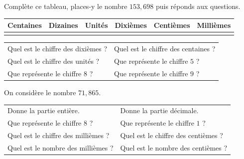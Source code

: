 \documentclass[a4paper,10pt]{report}
\begin{document}
\begin{ex}
Complète ce tableau, places-y le nombre $153,698$ puis réponds aux questions.
\begin{center}
\renewcommand{\arraystretch}{1.8}
\begin{tabularx}{\linewidth}{|*{6}{>{\centering \arraybackslash}X|}}
\rowcolor{exer1!20}Centaines & Dizaines & Unités & Dixièmes & Centièmes & Millièmes \\\hline
& & & & & \\\hline
\end{tabularx}
\end{center}

\begin{enumerate}
\begin{tabular}{m{7cm}m{7cm}}	
\item Quel est le chiffre des dixièmes ?&
\item Quel est le chiffre des centaines ?\\
\item Quel est le chiffre des unités ?&
\item Que représente le chiffre $5$ ?\\
\item Que représente le chiffre $8$ ?&
\item Que représente le chiffre $9$ ?\\
\end{tabular}
\end{enumerate}
\end{ex}

\begin{ex}
On considère le nombre $71,865$.
\begin{enumerate}
\begin{tabular}{m{7cm}m{7cm}}	
\item Donne la partie entière.&
\item Donne la partie décimale.\\
\item Que représente le chiffre $8$ ?&
\item Que représente le chiffre $1$ ?\\
\item Quel est le chiffre des millièmes ?&
\item Quel est le chiffre des centièmes ?\\
\item Quel est le nombre des millièmes ?&
\item Quel est le nombre des centièmes ?\\
\end{tabular}
\end{enumerate}
\end{ex}
\end{document}
